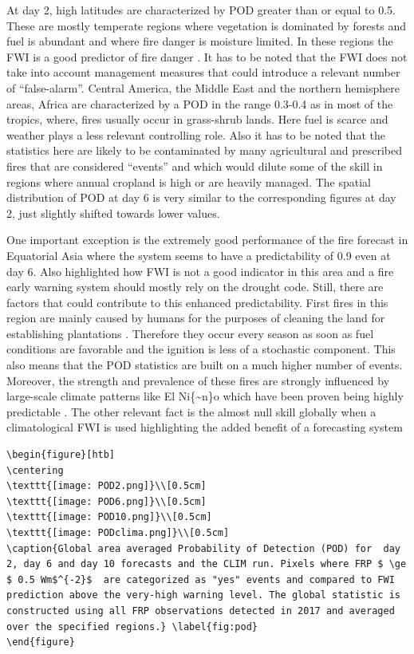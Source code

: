 \documentclass[, manuscript]{copernicus}
\begin{document}
At day 2, high latitudes are characterized by POD greater than or equal
to 0.5. These are mostly temperate regions where vegetation is dominated
by forests and fuel is abundant and where fire danger is moisture
limited. In these regions the FWI is a good predictor of fire danger
\citep{digiuseppe:16}. It has to be noted that the FWI does not take
into account management measures that could introduce a relevant number
of ``false-alarm''. Central America, the Middle East and the northern
hemisphere areas, Africa are characterized by a POD in the range 0.3-0.4
as in most of the tropics, where, fires usually occur in grass-shrub
lands. Here fuel is scarce and weather plays a less relevant controlling
role. Also it has to be noted that the statistics here are likely to be
contaminated by many agricultural and prescribed fires that are
considered ``events'' and which would dilute some of the skill in
regions where annual cropland is high or are heavily managed. The
spatial distribution of POD at day 6 is very similar to the
corresponding figures at day 2, just slightly shifted towards lower
values.

One important exception is the extremely good performance of the fire
forecast in Equatorial Asia where the system seems to have a
predictability of 0.9 even at day 6. Also \citet{degroot:07} highlighted
how FWI is not a good indicator in this area and a fire early warning
system should mostly rely on the drought code. Still, there are factors
that could contribute to this enhanced predictability. First fires in
this region are mainly caused by humans for the purposes of cleaning the
land for establishing plantations \citep{field:09,benedetti:16}.
Therefore they occur every season as soon as fuel conditions are
favorable and the ignition is less of a stochastic component. This also
means that the POD statistics are built on a much higher number of
events. Moreover, the strength and prevalence of these fires are
strongly influenced by large-scale climate patterns like El
Ni\{\textasciitilde{}n\}o \cite{field:04} which have been proven being
highly predictable \citep{zhu:15}. The other relevant fact is the almost
null skill globally when a climatological FWI is used highlighting the
added benefit of a forecasting system

\begin{verbatim}
\begin{figure}[htb]
\centering
\texttt{[image: POD2.png]}\\[0.5cm]
\texttt{[image: POD6.png]}\\[0.5cm]
\texttt{[image: POD10.png]}\\[0.5cm]
\texttt{[image: PODclima.png]}\\[0.5cm]
\caption{Global area averaged Probability of Detection (POD) for  day 2, day 6 and day 10 forecasts and the CLIM run. Pixels where FRP $ \ge $ 0.5 Wm$^{-2}$  are categorized as "yes" events and compared to FWI prediction above the very-high warning level. The global statistic is constructed using all FRP observations detected in 2017 and averaged over the specified regions.} \label{fig:pod}
\end{figure}
\end{verbatim}
\end{document}
